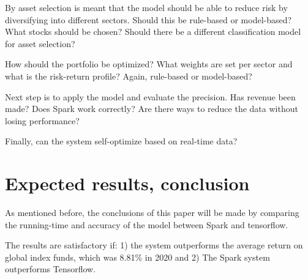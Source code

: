 By asset selection is meant that the model should be able to reduce risk by diversifying into different sectors. Should this be rule-based or model-based? What stocks should be chosen? Should there be a different classification model for asset selection? 

How should the portfolio be optimized? What weights are set per sector and what is the risk-return profile? Again, rule-based or model-based?

Next step is to apply the model and evaluate the precision. Has revenue been made? Does Spark work correctly? Are there ways to reduce the data without losing performance? 

Finally, can the system self-optimize based on real-time data? 

\section{Expected results, conclusion}%
\label{sec:verwachte_resultaten}

As mentioned before, the conclusions of this paper will be made by comparing the running-time and accuracy of the model between Spark and tensorflow. 

The results are satisfactory if: 1) the system outperforms the average return on global index funds, which was 8.81\% in 2020 and 2) The Spark system outperforms Tensorflow.



